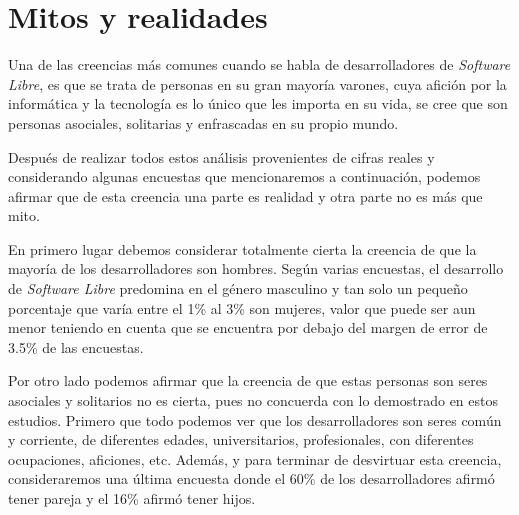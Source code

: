 \section{Mitos y realidades}

Una de las creencias más comunes cuando se habla  de desarrolladores de \textit{Software Libre}, es que se trata de personas en su gran mayoría varones, cuya afición por la informática y la tecnología es lo único que les importa en su vida, se cree que son personas asociales, solitarias y  enfrascadas en su propio mundo.

Después de realizar todos estos análisis  provenientes de cifras reales y considerando algunas encuestas que mencionaremos a continuación,  podemos afirmar que de esta creencia una parte es realidad y otra parte no es más que mito.

En primero lugar debemos considerar totalmente cierta la creencia de que la mayoría de los desarrolladores son  hombres. Según varias encuestas, el desarrollo de \textit{Software Libre} predomina en el género masculino y tan solo un pequeño porcentaje que varía entre el 1\% al 3\% son mujeres, valor que puede ser aun menor teniendo en cuenta que se encuentra por debajo del margen de error de 3.5\% de las encuestas.

Por otro lado podemos afirmar que la creencia de que estas personas son seres asociales y solitarios no es cierta, pues no concuerda con lo demostrado en estos estudios. Primero que todo podemos ver que los desarrolladores son seres común y corriente, de diferentes edades, universitarios, profesionales, con diferentes ocupaciones, aficiones, etc. Además, y para terminar de desvirtuar esta creencia, consideraremos  una última encuesta donde el 60\% de los desarrolladores afirmó tener pareja y el 16\% afirmó tener hijos.